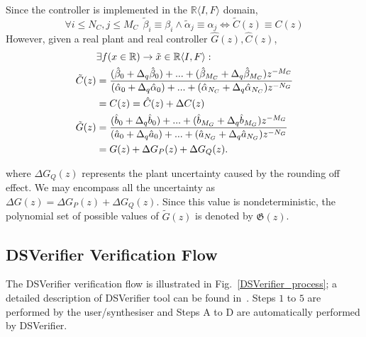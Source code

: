 \documentclass{sig-alternate-05-2015}
\newcommand{\red}[1]{{\color{red}#1}}
\begin{document}
Since the controller is implemented in the $\mathbb{R}\langle I,F \rangle$ domain, 
 $$\forall i \leq N_C, j \leq M_C\ \  \tilde \beta_{i} \equiv \beta_{i} \wedge \tilde \alpha_{j} \equiv \alpha_{j} \Leftrightarrow \tilde C(z) \equiv C(z)$$
However, given a real plant and real controller $\hat{G}(z), \hat{C}(z)$,
\begin{align}
\small
\label{FWL_tf}
&\exists f (x \in \mathbb{R}) \rightarrow \tilde x \in \mathbb{R}\langle I,F \rangle : \\
\label{digital_controller_tf}
\tilde C(z)&=\frac{(\hat{\beta}_{0}+\Delta_q \hat{\beta}_{0}) +...+(\hat{\beta}_{M_C}+\Delta_q \hat{\beta}_{M_C})z^{-M_C}}{(\hat{\alpha}_{0}+\Delta_q \hat{\alpha}_{0})+...+(\hat{\alpha}_{N_C}+\Delta_q \hat{\alpha}_{N_C})z^{-N_G}} \nonumber \\
&= C(z) =\hat{C}(z) + \Delta{C}(z)\\
\label{digital_plant_tf}
\tilde G(z)&=\frac{(\hat{b}_{0}+\Delta_q \hat{b}_{0}) +...+(\hat{b}_{M_G}+\Delta_q \hat{b}_{M_G})z^{-M_G}}{(\hat{a}_{0}+\Delta_q \hat{a}_{0})+...+(\hat{a}_{N_G}+\Delta_q \hat{a}_{N_G})z^{-N_G}} \nonumber \\
&=G(z)+\Delta{G}_P(z)+\Delta{G}_Q(z).
\end{align}
 
\vspace{1 mm} 
\noindent where $\Delta{G}_Q(z)$ represents the plant uncertainty caused by the rounding off effect. We may encompass all the uncertainty as $\Delta{G}(z)=\Delta{G}_P(z)+\Delta{G}_Q(z)$. Since this value is nondeterministic, the polynomial set of possible values of $\tilde G(z)$ is denoted by $\mathfrak{G}(z)$.

\subsection{DSVerifier Verification Flow}
\label{verification-flow}


The DSVerifier verification flow is illustrated in Fig.~\ref{DSVerifier_process};
a detailed description of DSVerifier tool can be found in~\cite{IsmailBCFF15}.
Steps $1$ to $5$ are performed by the user/synthesiser and
Steps A to D are automatically performed by DSVerifier.
\end{document}

